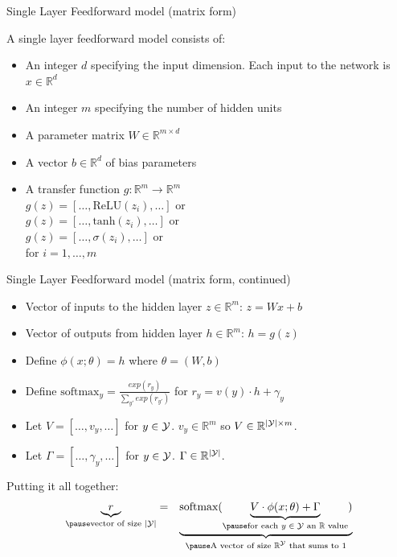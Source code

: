 \begin{frame}{Single Layer Feedforward model (matrix form)}
\begin{block}{A single layer feedforward model consists of:}
\begin{itemize}[<+->]
\item An integer $d$ specifying the input dimension. Each input to the network is $x \in \mathbb{R}^d$
\item An integer $m$ specifying the number of hidden units
\item A parameter matrix $W \in \mathbb{R}^{m \times d}$
\item A vector $b \in \mathbb{R}^d$ of bias parameters
\item A transfer function $g : \mathbb{R}^m \rightarrow \mathbb{R}^m$\\
$g(z) = [ \ldots, \textrm{ReLU}(z_i), \ldots ]$ or \\
$g(z) = [ \ldots, \textrm{tanh}(z_i), \ldots ]$ or \\
$g(z) = [ \ldots, \sigma(z_i), \ldots ]$ or \\
for $i = 1, \ldots, m$
\end{itemize}
\end{block}
\end{frame}

\begin{frame}{Single Layer Feedforward model (matrix form, continued)}
\begin{block}{}
\begin{itemize}[<+->]
\item Vector of inputs to the hidden layer $z \in \mathbb{R}^m$: $z = Wx + b$
\item Vector of outputs from hidden layer $h \in \mathbb{R}^m$: $h = g(z)$
\item Define $\phi(x; \theta) = h$ where $\theta = (W, b)$
\item Define $\textrm{softmax}_y = \frac{exp(r_y)}{\sum_{y'} exp(r_{y'})}$ for $r_y = v(y) \cdot h + \gamma_y$
\item Let $V = [ \ldots, v_y, \ldots ]$ for $y \in {\cal Y}$. $v_y \in \mathbb{R}^m$ so $V \in \mathbb{R}^{|{\cal Y}| \times m}$.
\item Let $\Gamma = [ \ldots, \gamma_y, \ldots ]$ for $y \in {\cal Y}$. $\Gamma \in \mathbb{R}^{|{\cal Y}|}$.
\end{itemize}
\end{block}
\pause
\begin{block}{Putting it all together:}
\begin{eqnarray*}
 \underbrace{r}_{\pause\textrm{vector of size $|{\cal Y}|$}} &=& \underbrace{\textrm{softmax}(\underbrace{V \cdot \phi(x;\theta) + \Gamma}_{\pause \text{for each $y \in {\cal Y}$ an $\mathbb{R}$ value}})}_{\pause \text{A vector of size $\mathbb{R}^{{\cal Y}}$ that sums to $1$}}
\end{eqnarray*}
\end{block}
\end{frame}

